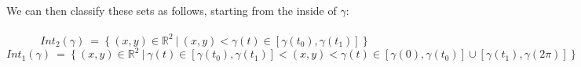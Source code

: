\documentclass[12pt]{article}
\begin{document}
  We can then classify these sets as follows, starting from the inside of $\gamma$:\\\\
  $$
  Int_2(\gamma) \ = \ \lbrace  \ (x,y) \in \mathbb{R}^2 \ \vert \ (x,y) < \gamma(t) \in [\gamma(t_0),\gamma(t_1)] \ \rbrace
  $$
 $$
  Int_1(\gamma) \ = \ \lbrace  \ (x,y) \in \mathbb{R}^2 \ \vert \ \gamma(t) \in [\gamma(t_0),\gamma(t_1)]<  (x,y) < \gamma(t) \in [\gamma(0),\gamma(t_0)] \cup [\gamma(t_1),\gamma(2\pi)] \ \rbrace
  $$
\end{document}

